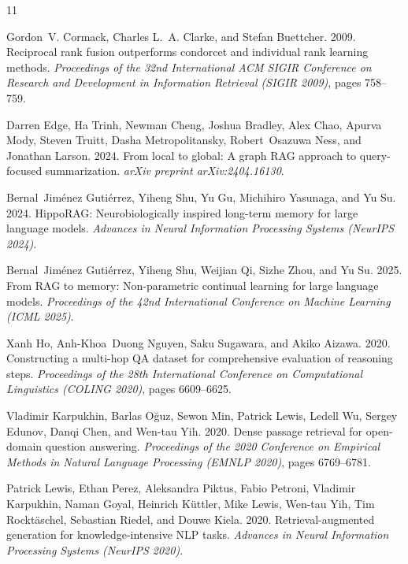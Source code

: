 \documentclass[runningheads]{llncs}
\begin{document}
\clearpage
\begin{thebibliography}{11}

Gordon~V. Cormack, Charles L.~A. Clarke, and Stefan Buettcher. 2009.
 Reciprocal rank fusion outperforms condorcet and individual rank learning methods.
 \emph{Proceedings of the 32nd International ACM SIGIR Conference on Research and Development in Information Retrieval (SIGIR 2009)}, pages 758--759.

Darren Edge, Ha Trinh, Newman Cheng, Joshua Bradley, Alex Chao, Apurva Mody, Steven Truitt, Dasha Metropolitansky, Robert~Osazuwa Ness, and Jonathan Larson. 2024.
 From local to global: A graph RAG approach to query-focused summarization.
 \emph{arXiv preprint arXiv:2404.16130}.

Bernal~Jim{\'e}nez Guti{\'e}rrez, Yiheng Shu, Yu Gu, Michihiro Yasunaga, and Yu Su. 2024.
 Hippo{RAG}: Neurobiologically inspired long-term memory for large language models.
 \emph{Advances in Neural Information Processing Systems (NeurIPS 2024)}.

Bernal~Jim{\'e}nez Guti{\'e}rrez, Yiheng Shu, Weijian Qi, Sizhe Zhou, and Yu Su. 2025.
 From {RAG} to memory: Non-parametric continual learning for large language models.
 \emph{Proceedings of the 42nd International Conference on Machine Learning (ICML 2025)}.

Xanh Ho, Anh-Khoa~Duong Nguyen, Saku Sugawara, and Akiko Aizawa. 2020.
 Constructing a multi-hop QA dataset for comprehensive evaluation of reasoning steps.
 \emph{Proceedings of the 28th International Conference on Computational Linguistics (COLING 2020)}, pages 6609--6625.

Vladimir Karpukhin, Barlas O{\u{g}}uz, Sewon Min, Patrick Lewis, Ledell Wu, Sergey Edunov, Danqi Chen, and Wen-tau Yih. 2020.
 Dense passage retrieval for open-domain question answering.
 \emph{Proceedings of the 2020 Conference on Empirical Methods in Natural Language Processing (EMNLP 2020)}, pages 6769--6781.

Patrick Lewis, Ethan Perez, Aleksandra Piktus, Fabio Petroni, Vladimir Karpukhin, Naman Goyal, Heinrich K{\"u}ttler, Mike Lewis, Wen-tau Yih, Tim Rockt{\"a}schel, Sebastian Riedel, and Douwe Kiela. 2020.
 Retrieval-augmented generation for knowledge-intensive NLP tasks.
 \emph{Advances in Neural Information Processing Systems (NeurIPS 2020)}.


\end{thebibliography}
\end{document}
